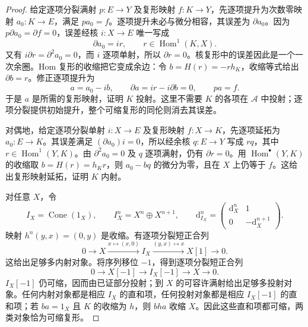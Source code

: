 \begin{proof}
	给定逐项分裂满射 \(p:E\to Y\) 及复形映射 \(f:K\to Y\)，先逐项提升为次数零映射 \(a_0:K\to E\)，满足 \(pa_0=f\)。逐项提升未必与微分相容，其误差为 \(\partial a_0\)。因为 \(p\partial a_0=\partial f=0\)，误差经核 \(i:X\to E\) 唯一写成
	\[
		\partial a_0=i r,\qquad r\in\operatorname{Hom}^1(K,X).
	\]
	又有 \(i\partial r=\partial^2a_0=0\)，而 \(i\) 逐项单射，所以 \(\partial r=0\)。核复形中的误差因此是一个一次余圈。Hom 复形的收缩把它变成余边：令 \(b=H(r)=-rh_K\)，收缩等式给出 \(\partial b=r\)。修正逐项提升为
	\[
		a=a_0-i b,\qquad \partial a=ir-i\partial b=0,\qquad pa=f.
	\]
	于是 \(a\) 是所需的复形映射，证明 \(K\) 投射。这里不需要 \(K\) 的各项在 \(\mathcal A\) 中投射；逐项分裂提供初始提升，整个可缩复形的同伦则消去其误差。

	对偶地，给定逐项分裂单射 \(i:X\to E\) 及复形映射 \(f:X\to K\)，先逐项延拓为 \(a_0:E\to K\)。其误差满足 \((\partial a_0)i=0\)，所以经余核 \(q:E\to Y\) 写成 \(rq\)，其中 \(r\in\operatorname{Hom}^1(Y,K)\)。由 \(\partial^2a_0=0\) 及 \(q\) 逐项满射，仍有 \(\partial r=0\)。用 \(\operatorname{Hom}^\bullet(Y,K)\) 的收缩取 \(b=H(r)=h_Kr\)，则 \(a_0-bq\) 的微分为零，且在 \(X\) 上仍等于 \(f\)。这给出复形映射延拓，证明 \(K\) 内射。

	对任意 \(X\)，令
	\[
		I_X=\operatorname{Cone}(1_X),\qquad I_X^n=X^n\oplus X^{n+1},\qquad \mathrm{d}_{I_X}^n=
		\begin{pmatrix}\mathrm{d}_X^n&1\\0&-\mathrm{d}_X^{n+1}\end{pmatrix}.
	\]
	映射 \(h^n(y,x)=(0,y)\) 是收缩。有逐项分裂短正合列
	\begin{equation}\label{b4:eq:D-contractible-embedding}
		0\longrightarrow X\xrightarrow{x\mapsto(x,0)}I_X \xrightarrow{(y,x)\mapsto x}X[1]\longrightarrow0.
	\end{equation}
	这给出足够多内射对象。将序列移位 \(-1\)，得到逐项分裂短正合列
	\[
		0\longrightarrow X[-1]\longrightarrow I_X[-1]\longrightarrow X\longrightarrow0.
	\]
	\(I_X[-1]\) 仍可缩，因而由已证部分投射；到 \(X\) 的可容许满射给出足够多投射对象。任何内射对象都是相应 \(I_X\) 的直和项，任何投射对象都是相应 \(I_X[-1]\) 的直和项；若 \(ba=1_X\) 且 \(K\) 的收缩为 \(h\)，则 \(bha\) 收缩 \(X\)。因此这些直和项都可缩，两类对象恰为可缩复形。
\end{proof}

